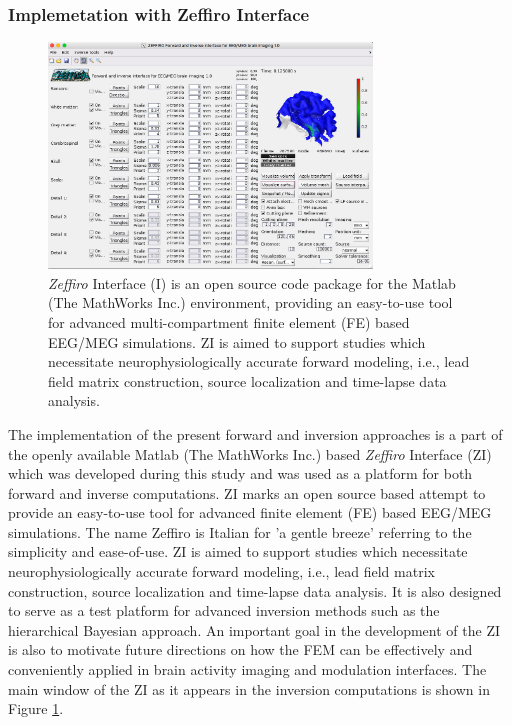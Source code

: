 \documentclass[5p]{elsarticle}
\begin{document}
\subsubsection{Implemetation with Zeffiro Interface}

\begin{figure}[h!]
\begin{footnotesize}
\begin{center}
\begin{minipage}{8.6cm} \begin{center}
\includegraphics[width=8.6cm]{zeffiro_interface.png}
\end{center}
\end{minipage} 
\end{center}
\end{footnotesize}
\caption{{\em Zeffiro} Interface (I) \cite{ZeffiroInterface} is an open source code package for the Matlab (The MathWorks Inc.) environment, providing an easy-to-use tool for advanced multi-compartment finite element (FE) based EEG/MEG simulations. ZI is aimed to support studies which necessitate neurophysiologically accurate forward modeling, i.e., lead field matrix construction, source localization and time-lapse data analysis.}
\label{fig:zeffiro_interface} 
\end{figure}

The implementation of the present forward and inversion approaches is a part of the openly available Matlab (The MathWorks Inc.) based {\em Zeffiro}  Interface \cite{ZeffiroInterface} (ZI) which was developed during this study and was used as a platform for both forward and inverse computations. ZI  marks an open source based attempt to provide an easy-to-use tool for advanced finite element (FE) based EEG/MEG simulations. The name Zeffiro is Italian for 'a gentle breeze' referring to the simplicity and ease-of-use. ZI is aimed to support studies which necessitate neurophysiologically accurate forward modeling, i.e., lead field matrix construction, source localization and time-lapse data analysis. It is also designed to serve as a test platform for advanced inversion methods such as the hierarchical Bayesian approach. An important goal in the development of the ZI is also to motivate future directions on how the FEM can be effectively and conveniently applied in brain activity imaging and modulation interfaces. The main window of the ZI as it appears in the inversion computations is shown in Figure \ref{fig:zeffiro_interface}.
\end{document}
